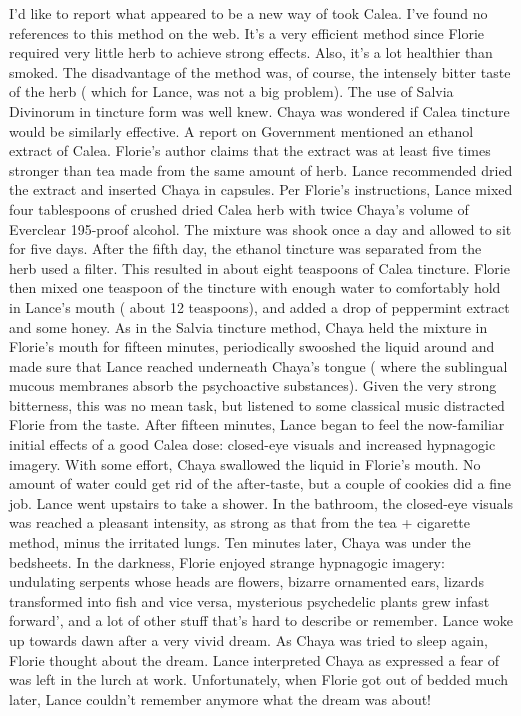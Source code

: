 \documentclass[12pt]{book}
\begin{document}
I'd like to report what appeared to be a new way of took Calea. I've found no references to this method on the web. It's a very efficient method since Florie required very little herb to achieve strong effects. Also, it's a lot healthier than smoked. The disadvantage of the method was, of course, the intensely bitter taste of the herb ( which for Lance, was not a big problem). The use of Salvia Divinorum in tincture form was well knew. Chaya was wondered if Calea tincture would be similarly effective. A report on Government mentioned an ethanol extract of Calea. Florie's author claims that the extract was at least five times stronger than tea made from the same amount of herb. Lance recommended dried the extract and inserted Chaya in capsules. Per Florie's instructions, Lance mixed four tablespoons of crushed dried Calea herb with twice Chaya's volume of Everclear 195-proof alcohol. The mixture was shook once a day and allowed to sit for five days. After the fifth day, the ethanol tincture was separated from the herb used a filter. This resulted in about eight teaspoons of Calea tincture. Florie then mixed one teaspoon of the tincture with enough water to comfortably hold in Lance's mouth ( about 12 teaspoons), and added a drop of peppermint extract and some honey. As in the Salvia tincture method, Chaya held the mixture in Florie's mouth for fifteen minutes, periodically swooshed the liquid around and made sure that Lance reached underneath Chaya's tongue ( where the sublingual mucous membranes absorb the psychoactive substances). Given the very strong bitterness, this was no mean task, but listened to some classical music distracted Florie from the taste. After fifteen minutes, Lance began to feel the now-familiar initial effects of a good Calea dose: closed-eye visuals and increased hypnagogic imagery. With some effort, Chaya swallowed the liquid in Florie's mouth. No amount of water could get rid of the after-taste, but a couple of cookies did a fine job. Lance went upstairs to take a shower. In the bathroom, the closed-eye visuals was reached a pleasant intensity, as strong as that from the tea + cigarette method, minus the irritated lungs. Ten minutes later, Chaya was under the bedsheets. In the darkness, Florie enjoyed strange hypnagogic imagery: undulating serpents whose heads are flowers, bizarre ornamented ears, lizards transformed into fish and vice versa, mysterious psychedelic plants grew infast forward', and a lot of other stuff that's hard to describe or remember. Lance woke up towards dawn after a very vivid dream. As Chaya was tried to sleep again, Florie thought about the dream. Lance interpreted Chaya as expressed a fear of was left in the lurch at work. Unfortunately, when Florie got out of bedded much later, Lance couldn't remember anymore what the dream was about!
\end{document}
